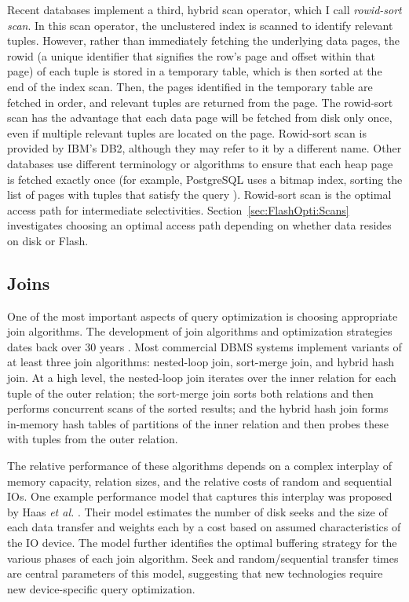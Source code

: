 Recent databases implement a third, hybrid scan operator, which I call \emph{rowid-sort scan}.
In this scan operator, the unclustered index is scanned to identify relevant tuples.
However, rather than immediately fetching the underlying data pages, the rowid (a unique identifier that signifies the row's page and offset within that page) of each tuple is stored in a temporary table, which is then sorted at the end of the index scan.
Then, the pages identified in the temporary table are fetched in order, and relevant tuples are returned from the page.
The rowid-sort scan has the advantage that each data page will be fetched from disk only once, even if multiple relevant tuples are located on the page. 
Rowid-sort scan is provided by IBM's DB2, although they may refer to it by a different name.
Other databases use different terminology or algorithms to ensure that each heap page is fetched exactly once (for example, PostgreSQL uses a bitmap index, sorting the list of pages with tuples that satisfy the query \cite{PostgresLossyBitMap}).
Rowid-sort scan is the optimal access path for intermediate selectivities.
Section~\ref{sec:FlashOpti:Scans} investigates choosing an optimal access path depending on whether data resides on disk or Flash.

\subsection{Joins}
\label{sec:Background:Joins}

One of the most important aspects of query optimization is choosing appropriate join algorithms.
The development of join algorithms and optimization strategies dates back over 30 years \cite{Selinger1979,Shapiro1986}. 
Most commercial DBMS systems implement variants of at least three join algorithms: nested-loop join, sort-merge join, and hybrid hash join.
At a high level, the nested-loop join iterates over the inner relation for each tuple of the outer relation; the sort-merge join sorts both relations and then performs concurrent scans of the sorted results; and the hybrid hash join forms in-memory hash tables of partitions of the inner relation and then probes these with tuples from the outer relation.

The relative performance of these algorithms depends on a complex interplay of memory capacity, relation sizes, and the relative costs of random and sequential IOs.  
One example performance model that captures this interplay was proposed by Haas \emph{et al.} \cite{DBLP:journals/vldb/HaasCLS97}.
Their model estimates the number of disk seeks and the size of each data transfer and weights each by a cost based on assumed characteristics of the IO device.
The model further identifies the optimal buffering strategy for the various phases of each join algorithm.
Seek and random/sequential transfer times are central parameters of this model, suggesting that new technologies require new device-specific query optimization.

